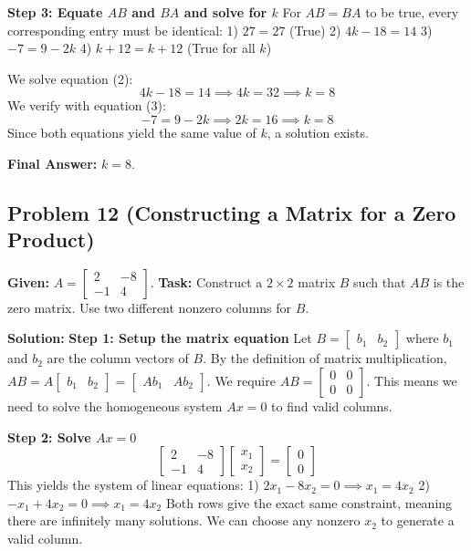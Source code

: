 \documentclass{article}
\begin{document}
\textbf{Step 3: Equate $AB$ and $BA$ and solve for $k$}
For $AB = BA$ to be true, every corresponding entry must be identical:
1) $27 = 27$ (True)
2) $4k - 18 = 14$
3) $-7 = 9 - 2k$
4) $k + 12 = k + 12$ (True for all $k$)

We solve equation (2):
\[ 4k - 18 = 14 \implies 4k = 32 \implies k = 8 \]
We verify with equation (3):
\[ -7 = 9 - 2k \implies 2k = 16 \implies k = 8 \]
Since both equations yield the same value of $k$, a solution exists.

\textbf{Final Answer:} $k = 8$.

\vspace{1em}
\subsection*{Problem 12 (Constructing a Matrix for a Zero Product)}
\textbf{Given:} $A = \begin{bmatrix} 2 & -8 \\ -1 & 4 \end{bmatrix}$. 
\textbf{Task:} Construct a $2 \times 2$ matrix $B$ such that $AB$ is the zero matrix. Use two different nonzero columns for $B$.

\textbf{Solution:}
\textbf{Step 1: Setup the matrix equation}
Let $B = \begin{bmatrix} b_1 & b_2 \end{bmatrix}$ where $b_1$ and $b_2$ are the column vectors of $B$. By the definition of matrix multiplication, $AB = A\begin{bmatrix} b_1 & b_2 \end{bmatrix} = \begin{bmatrix} Ab_1 & Ab_2 \end{bmatrix}$.
We require $AB = \begin{bmatrix} 0 & 0 \\ 0 & 0 \end{bmatrix}$. This means we need to solve the homogeneous system $Ax = 0$ to find valid columns.

\textbf{Step 2: Solve $Ax = 0$}
\[ \begin{bmatrix} 2 & -8 \\ -1 & 4 \end{bmatrix} \begin{bmatrix} x_1 \\ x_2 \end{bmatrix} = \begin{bmatrix} 0 \\ 0 \end{bmatrix} \]
This yields the system of linear equations:
1) $2x_1 - 8x_2 = 0 \implies x_1 = 4x_2$
2) $-x_1 + 4x_2 = 0 \implies x_1 = 4x_2$
Both rows give the exact same constraint, meaning there are infinitely many solutions. We can choose any nonzero $x_2$ to generate a valid column.
\end{document}
